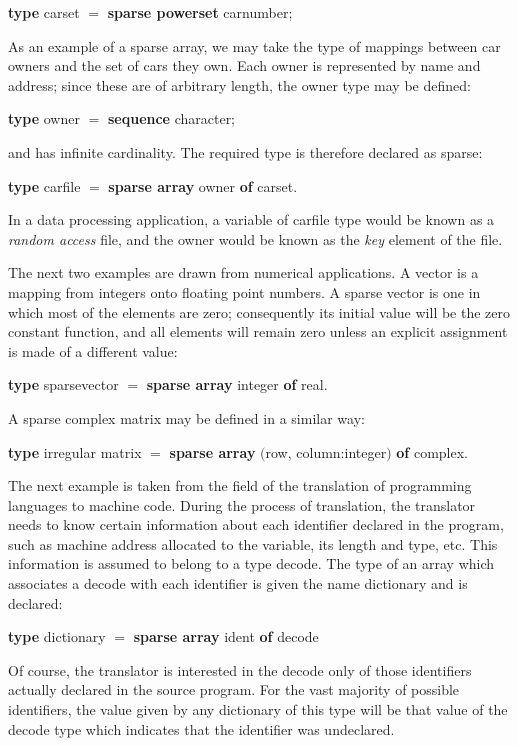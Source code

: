 \quad \textbf{type} carset $=$ \textbf{sparse powerset} carnumber;

As an example of a sparse array, we may take the type of mappings between car owners and the set of cars they own. Each owner is represented by name and address; since these are of arbitrary length, the owner type may be defined:

\quad \textbf{type} owner $=$ \textbf{sequence} character;

\noindent
and has infinite cardinality. The required type is therefore declared as sparse:

\quad \textbf{type} carfile $=$ \textbf{sparse array} owner \textbf{of} carset.

In a data processing application, a variable of carfile type would be known as a \textit{random access} file, and the owner would be known as the \textit{key} element of the file.

The next two examples are drawn from numerical applications. A vector is a mapping from integers onto floating point numbers. A sparse vector is one in which most of the elements are zero; consequently its initial value will be the zero constant function, and all elements will remain zero unless an explicit assignment is made of a different value:

\quad \textbf{type} sparsevector $=$ \textbf{sparse array} integer \textbf{of} real.

\noindent
A sparse complex matrix may be defined in a similar way:

\quad \textbf{type} irregular matrix $=$ \textbf{sparse array} $($row, column:integer$)$ \textbf{of} complex.

The next example is taken from the field of the translation of programming languages to machine code. During the process of translation, the translator needs to know certain information about each identifier declared in the program, such as machine address allocated to the variable, its length and type, etc. This information is assumed to belong to a type decode. The type of an array which associates a decode with each identifier is given the name dictionary and is declared:

\quad \textbf{type} dictionary $=$ \textbf{sparse array} ident \textbf{of} decode

\noindent
Of course, the translator is interested in the decode only of those identifiers actually declared in the source program. For the vast majority of possible identifiers, the value given by any dictionary of this type will be that value of the decode type which indicates that the identifier was undeclared.

